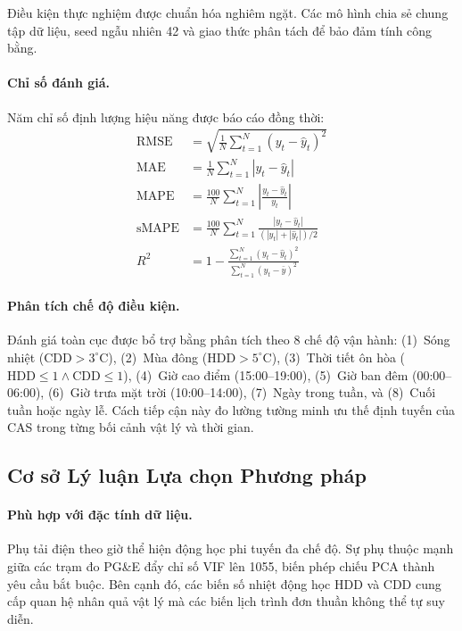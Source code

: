 Điều kiện thực nghiệm được chuẩn hóa nghiêm ngặt. Các mô hình chia sẻ chung tập dữ liệu, seed ngẫu nhiên 42 và giao thức phân tách để bảo đảm tính công bằng.

\paragraph{Chỉ số đánh giá.}
Năm chỉ số định lượng hiệu năng được báo cáo đồng thời:
\begin{align}
    \text{RMSE} &= \sqrt{\frac{1}{N}\sum_{t=1}^N (y_t - \hat{y}_t)^2} \\
    \text{MAE} &= \frac{1}{N}\sum_{t=1}^N |y_t - \hat{y}_t| \\
    \text{MAPE} &= \frac{100}{N}\sum_{t=1}^N \left|\frac{y_t - \hat{y}_t}{y_t}\right| \\
    \text{sMAPE} &= \frac{100}{N}\sum_{t=1}^N \frac{|y_t - \hat{y}_t|}{(|y_t| + |\hat{y}_t|)/2} \\
    R^2 &= 1 - \frac{\sum_{t=1}^N (y_t - \hat{y}_t)^2}{\sum_{t=1}^N (y_t - \bar{y})^2}
\end{align}

\paragraph{Phân tích chế độ điều kiện.}
Đánh giá toàn cục được bổ trợ bằng phân tích theo 8 chế độ vận hành: (1)~Sóng nhiệt ($\text{CDD} > 3^\circ\text{C}$), (2)~Mùa đông ($\text{HDD} > 5^\circ\text{C}$), (3)~Thời tiết ôn hòa ($\text{HDD} \leq 1 \wedge \text{CDD} \leq 1$), (4)~Giờ cao điểm (15:00--19:00), (5)~Giờ ban đêm (00:00--06:00), (6)~Giờ trưa mặt trời (10:00--14:00), (7)~Ngày trong tuần, và (8)~Cuối tuần hoặc ngày lễ. Cách tiếp cận này đo lường tường minh ưu thế định tuyến của CAS trong từng bối cảnh vật lý và thời gian.

\subsection{Cơ sở Lý luận Lựa chọn Phương pháp}
\label{subsec:rationale}

\paragraph{Phù hợp với đặc tính dữ liệu.}
Phụ tải điện theo giờ thể hiện động học phi tuyến đa chế độ. Sự phụ thuộc mạnh giữa các trạm đo PG\&E đẩy chỉ số VIF lên 1055, biến phép chiếu PCA thành yêu cầu bắt buộc. Bên cạnh đó, các biến số nhiệt động học HDD và CDD cung cấp quan hệ nhân quả vật lý mà các biến lịch trình đơn thuần không thể tự suy diễn.

